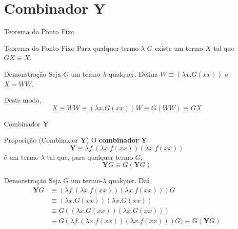 \section{Combinador $\mathbf{Y}$}

\begin{frame}[fragile]{Teorema do Ponto Fixo}

    \begin{block}{Teorema do Ponto Fixo}
        Para qualquer termo-$\lambda$ $G$ existe um termo $X$ tal que $GX\equiv X$.
    \end{block}

    \vspace{0.2in}

    \begin{block}{Demonstração}
        Seja $G$ um termo-$\lambda$ qualquer. Defina $W\equiv (\lambda x.G(xx))$ e $X=WW$. 

        Deste modo,
        \[
            X\equiv WW \equiv (\lambda x.G(xx))W \equiv G(WW)\equiv GX
        \]
    \end{block}
\end{frame}

\begin{frame}[fragile]{Combinador $\mathbf{Y}$}

    \begin{block}{Proposição (Combinador $\mathbf{Y}$)}
    O \textbf{combinador} $\mathbf{Y}$
    \[
        \mathbf{Y}\equiv \lambda f.(\lambda x.f(xx))(\lambda x.f(xx))
    \]
    é um termo-$\lambda$ tal que, para qualquer termo $G$,
    \[
        \mathbf{Y}G\equiv G(\mathbf{Y}G)
    \]
    \end{block}

    \vspace{0.1in}

    \begin{block}{Demonstração}
        Seja $G$ um termo-$\lambda$ qualquer. Daí
        \begin{align*}
            \mathbf{Y}G &\equiv (\lambda f.(\lambda x.f(xx))(\lambda x.f(xx)))G \\
             &\equiv (\lambda x.G(xx))(\lambda x.G(xx)) \\
             &\equiv G((\lambda x.G(xx))(\lambda x.G(xx))) \\
             &\equiv G(\lambda f.(\lambda x.f(xx))(\lambda x.f(xx)))G) \equiv G(\mathbf{Y}G)
        \end{align*}
    \end{block}
\end{frame}

